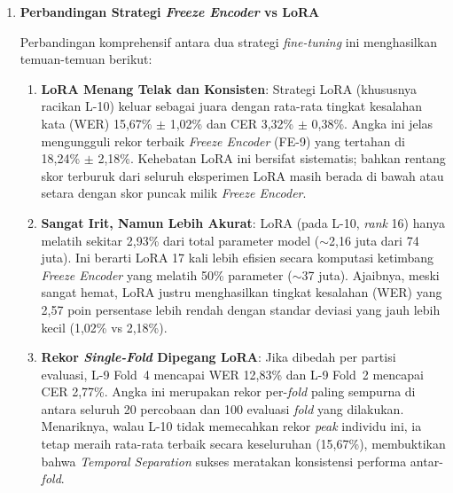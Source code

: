 \begin{enumerate}
    Sistem ASR bahasa Minangkabau berhasil dirancang dan diimplementasikan menggunakan ekosistem \textit{open-source}: Python sebagai bahasa pemrograman utama, PyTorch sebagai \textit{framework} \textit{deep learning}, Hugging Face Transformers untuk manajemen model dan \textit{tokenizer}, serta PEFT (\textit{Parameter-Efficient Fine-Tuning}) library untuk implementasi LoRA. \textit{Pipeline} yang dibangun mencakup modul \textit{audio preprocessing} (konversi format, \textit{resampling} ke 16 kHz, validasi durasi), \textit{text preprocessing} (normalisasi teks Minangkabau), augmentasi data (\textit{SpecAugment}, \textit{speed perturbation}, \textit{noise injection}), dan infrastruktur \textit{training} dengan \textit{monitoring} real-time melalui \textit{Weights \& Biases}. Seluruh kode diimplementasikan dengan desain modular yang memungkinkan konfigurasi fleksibel dan reprodusibilitas eksperimen.

    \item \textbf{Perbandingan Strategi \textit{Freeze Encoder} vs LoRA}

    Perbandingan komprehensif antara dua strategi \textit{fine-tuning} ini menghasilkan temuan-temuan berikut:

    \begin{enumerate}
        \item \textbf{LoRA Menang Telak dan Konsisten}: Strategi LoRA (khususnya racikan L-10) keluar sebagai juara dengan rata-rata tingkat kesalahan kata (WER) 15,67\% $\pm$ 1,02\% dan CER 3,32\% $\pm$ 0,38\%. Angka ini jelas mengungguli rekor terbaik \textit{Freeze Encoder} (FE-9) yang tertahan di 18,24\% $\pm$ 2,18\%. Kehebatan LoRA ini bersifat sistematis; bahkan rentang skor terburuk dari seluruh eksperimen LoRA masih berada di bawah atau setara dengan skor puncak milik \textit{Freeze Encoder}.

        \item \textbf{Sangat Irit, Namun Lebih Akurat}: LoRA (pada L-10, \textit{rank} 16) hanya melatih sekitar 2,93\% dari total parameter model ($\sim$2,16 juta dari 74 juta). Ini berarti LoRA 17 kali lebih efisien secara komputasi ketimbang \textit{Freeze Encoder} yang melatih 50\% parameter ($\sim$37 juta). Ajaibnya, meski sangat hemat, LoRA justru menghasilkan tingkat kesalahan (WER) yang 2,57 poin persentase lebih rendah dengan standar deviasi yang jauh lebih kecil (1,02\% vs 2,18\%).

        \item \textbf{Rekor \textit{Single-Fold} Dipegang LoRA}: Jika dibedah per partisi evaluasi, L-9 Fold~4 mencapai WER 12,83\% dan L-9 Fold~2 mencapai CER 2,77\%. Angka ini merupakan rekor per-\textit{fold} paling sempurna di antara seluruh 20 percobaan dan 100 evaluasi \textit{fold} yang dilakukan. Menariknya, walau L-10 tidak memecahkan rekor \textit{peak} individu ini, ia tetap meraih rata-rata terbaik secara keseluruhan (15,67\%), membuktikan bahwa \textit{Temporal Separation} sukses meratakan konsistensi performa antar-\textit{fold}.


\end{enumerate}
\end{enumerate}
